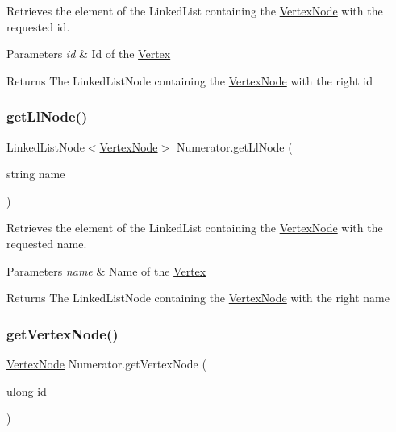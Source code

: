 Retrieves the element of the Linked\+List containing the \hyperlink{classVertexNode}{Vertex\+Node} with the requested id. 


\begin{DoxyParams}{Parameters}
{\em id} & Id of the \hyperlink{structVertex}{Vertex}\\
\hline
\end{DoxyParams}
\begin{DoxyReturn}{Returns}
The Linked\+List\+Node containing the \hyperlink{classVertexNode}{Vertex\+Node} with the right id
\end{DoxyReturn}
\mbox{\label{classNumerator_aff4348496d1326c9d6c4ee71be22c05b}} 
\subsubsection{\texorpdfstring{get\+Ll\+Node()}{getLlNode()}\hspace{0.1cm}{\footnotesize\ttfamily [2/2]}}
{\footnotesize\ttfamily Linked\+List\+Node$<$\hyperlink{classVertexNode}{Vertex\+Node}$>$ Numerator.\+get\+Ll\+Node (\begin{DoxyParamCaption}\item[{string}]{name }\end{DoxyParamCaption})\hspace{0.3cm}{\ttfamily [inline]}}



Retrieves the element of the Linked\+List containing the \hyperlink{classVertexNode}{Vertex\+Node} with the requested name. 


\begin{DoxyParams}{Parameters}
{\em name} & Name of the \hyperlink{structVertex}{Vertex}\\
\hline
\end{DoxyParams}
\begin{DoxyReturn}{Returns}
The Linked\+List\+Node containing the \hyperlink{classVertexNode}{Vertex\+Node} with the right name
\end{DoxyReturn}
\mbox{\label{classNumerator_ae9abf16e1eb7b23aa494e5549295c2da}} 
\subsubsection{\texorpdfstring{get\+Vertex\+Node()}{getVertexNode()}\hspace{0.1cm}{\footnotesize\ttfamily [1/3]}}
{\footnotesize\ttfamily \hyperlink{classVertexNode}{Vertex\+Node} Numerator.\+get\+Vertex\+Node (\begin{DoxyParamCaption}\item[{ulong}]{id }\end{DoxyParamCaption})\hspace{0.3cm}{\ttfamily [inline]}}



